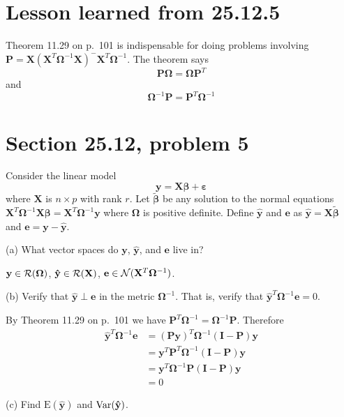 \section*{Lesson learned from 25.12.5}
Theorem 11.29 on p.\ 101 is indispensable for doing
problems involving $\mathbf P=\mathbf X(\mathbf X^T
\bm\Omega^{-1}\mathbf X)^{-{}}\mathbf X^T\bm\Omega^{-1}$.
The theorem says
\[\mathbf P\bm\Omega=\bm\Omega\mathbf P^T\]
and
\[\bm\Omega^{-1}\mathbf P=\mathbf P^T\bm\Omega^{-1}\]

\section{Section 25.12, problem 5}
Consider the linear model
\[
\mathbf y=\mathbf X\bm\beta+\bm\varepsilon
\]
where $\mathbf X$ is $n\times p$ with rank $r$.
Let $\bm{\tilde\beta}$ be any solution to the normal equations
$\mathbf X^T\bm\Omega^{-1}\mathbf X\bm\beta
=\mathbf X^T\bm\Omega^{-1}\mathbf y$ where $\bm\Omega$
is positive definite.
Define $\mathbf{\hat y}$ and $\mathbf e$ as
$\mathbf{\hat y}=\mathbf X\bm{\tilde\beta}$ and
$\mathbf e=\mathbf y-\mathbf{\hat y}$.

\bigskip
\noindent
(a) What vector spaces do $\mathbf y$, $\mathbf{\hat y}$,
and $\mathbf e$ live in?

\bigskip
\noindent
$\mathbf y\in{\cal R}(\bm\Omega)$,
$\mathbf{\hat y}\in{\cal R}(\mathbf X)$,
$\mathbf e\in{\cal N}(\mathbf X^T\bm\Omega^{-1})$.

\bigskip
\noindent
(b) Verify that $\mathbf{\hat y}\perp\mathbf e$ in the metric
$\bm\Omega^{-1}$.
That is, verify that $\mathbf{\hat y}^T\bm\Omega^{-1}\mathbf e=0$.

\bigskip
\noindent
By Theorem 11.29 on p.\ 101 we have
$\mathbf P^T\bm\Omega^{-1}=\bm\Omega^{-1}\mathbf P$.
Therefore
\begin{align*}
\mathbf{\hat y}^T\bm\Omega^{-1}\mathbf e
&=(\mathbf{Py})^T\bm\Omega^{-1}(\mathbf I-\mathbf P)\mathbf y\\
&=\mathbf y^T\mathbf P^T\bm\Omega^{-1}(\mathbf I-\mathbf P)
\mathbf y\\
&=\mathbf y^T\bm\Omega^{-1}\mathbf P(\mathbf I-\mathbf P)\mathbf y\\
&=0
\end{align*}

\bigskip
\noindent
(c) Find $\mathrm E(\mathbf{\hat y})$ and
$\mathop{\rm Var}(\mathbf{\hat y})$.

